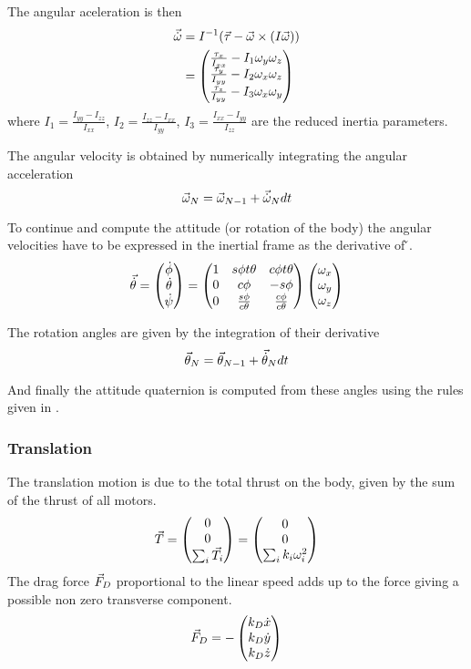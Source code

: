 The angular aceleration is then
\begin{align}
	\vec{\dot{\omega}} &= I^{-1}(\vec{\tau} - \vec{\omega}\times(I\vec{\omega})) \\
	&= \begin{pmatrix}
		\frac{\tau_x}{I_{xx}} - I_1\omega_y\omega_z\\
		\frac{\tau_y}{I_{yy}} - I_2\omega_x\omega_z\\
		\frac{\tau_z}{I_{yy}} - I_3\omega_x\omega_y
	\end{pmatrix}
\end{align}
where $I_1 = \frac{I_{yy}-I_{zz}}{I_{xx}}$, $I_2 = \frac{I_{zz}-I_{xx}}{I_{yy}}$, $I_3 = \frac{I_{xx}-I_{yy}}{I_{zz}}$
are the reduced inertia parameters.

The angular velocity is obtained by numerically integrating the angular acceleration
\begin{equation}
	\vec{\omega}_N = \vec{\omega}_{N-1} + \vec{\dot{\omega}}_N dt
\end{equation} 

To continue and compute the attitude (or rotation of the body) the angular velocities have to be expressed in the
inertial frame as the derivative of \v{\theta}.
\begin{equation}
	\vec{\dot{\theta}} = \begin{pmatrix}\dot{\phi}\\\dot{\theta}\\\dot{\psi}\end{pmatrix} = \begin{pmatrix}
		1 & s\phi t\theta & c\phi t\theta\\
		0 & c\phi & -s\phi\\ 
		0 & \frac{s\phi}{c\theta} & \frac{c\phi}{c\theta}
	\end{pmatrix}\begin{pmatrix}\omega_x\\\omega_y\\\omega_z\end{pmatrix}
\end{equation}

The rotation angles are given by the integration of their derivative
\begin{equation}
	\vec{\theta}_N = \vec{\theta}_{N-1} + \vec{\dot{\theta}}_N dt
\end{equation}

And finally the attitude quaternion  is computed from these angles using the rules given in .  

\subsubsection{Translation}
The translation motion is due to the total thrust on the body, given
by the sum of the thrust of all motors. 
\begin{equation}\labeleq{bodyThrust}
	\v{T} = \matrix{0\\0\\\sum_{i}{\v{T_i}}} = \matrix{0\\0\\\sum_{i}{k_i\om^2}}
\end{equation}
The drag force $\vec{F}_D$ proportional to the linear speed adds up to the force giving a possible non zero transverse
component.
\begin{equation}
	\vec{F}_D = -\begin{pmatrix}k_D\dot{x}\\k_D\dot{y}\\k_D\dot{z}\end{pmatrix}
\end{equation}

